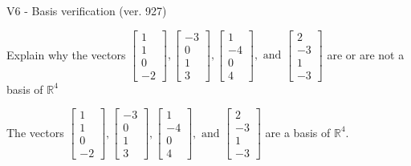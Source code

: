 \begin{exercise}
  \begin{exerciseTitle}V6 - Basis verification (ver. 927)\end{exerciseTitle}
  \begin{exerciseStatement}
    Explain why the vectors \(\left[\begin{array}{r}
1 \\
1 \\
0 \\
-2
\end{array}\right] , \left[\begin{array}{r}
-3 \\
0 \\
1 \\
3
\end{array}\right] , \left[\begin{array}{r}
1 \\
-4 \\
0 \\
4
\end{array}\right] , \text{ and } \left[\begin{array}{r}
2 \\
-3 \\
1 \\
-3
\end{array}\right]\) are or are not a basis of \(\mathbb{R}^4\)	


  \end{exerciseStatement}
  \begin{exerciseAnswer}
   The vectors \(\left[\begin{array}{r}
1 \\
1 \\
0 \\
-2
\end{array}\right] , \left[\begin{array}{r}
-3 \\
0 \\
1 \\
3
\end{array}\right] , \left[\begin{array}{r}
1 \\
-4 \\
0 \\
4
\end{array}\right] , \text{ and } \left[\begin{array}{r}
2 \\
-3 \\
1 \\
-3
\end{array}\right]\) 
  	 are  a basis of \(\mathbb{R}^4\).
  


  \end{exerciseAnswer}
\end{exercise}